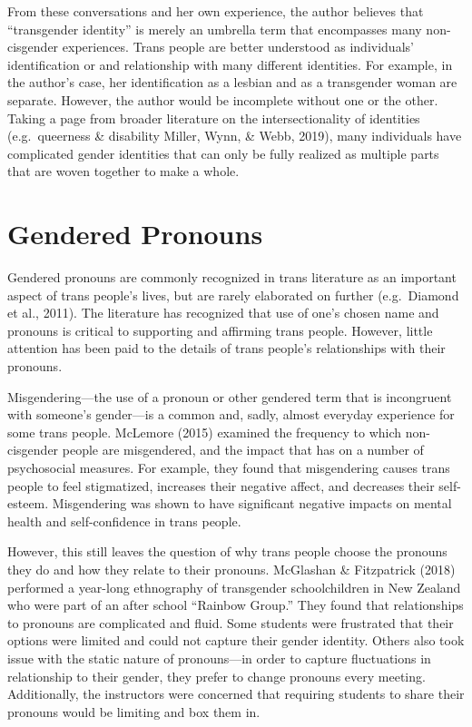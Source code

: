 \documentclass[12pt,twoside]{reedthesis}
\begin{document}
From these conversations and her own experience, the author believes that ``transgender identity'' is merely an umbrella term that encompasses many non-cisgender experiences. Trans people are better understood as individuals' identification or and relationship with many different identities. For example, in the author's case, her identification as a lesbian and as a transgender woman are separate. However, the author would be incomplete without one or the other. Taking a page from broader literature on the intersectionality of identities (e.g.~queerness \& disability Miller, Wynn, \& Webb, 2019), many individuals have complicated gender identities that can only be fully realized as multiple parts that are woven together to make a whole.

\hypertarget{gendered-pronouns}{%
\section{Gendered Pronouns}\label{gendered-pronouns}}

Gendered pronouns are commonly recognized in trans literature as an important aspect of trans people's lives, but are rarely elaborated on further (e.g.~Diamond et al., 2011). The literature has recognized that use of one's chosen name and pronouns is critical to supporting and affirming trans people. However, little attention has been paid to the details of trans people's relationships with their pronouns.

Misgendering---the use of a pronoun or other gendered term that is incongruent with someone's gender---is a common and, sadly, almost everyday experience for some trans people. McLemore (2015) examined the frequency to which non-cisgender people are misgendered, and the impact that has on a number of psychosocial measures. For example, they found that misgendering causes trans people to feel stigmatized, increases their negative affect, and decreases their self-esteem. Misgendering was shown to have significant negative impacts on mental health and self-confidence in trans people.

However, this still leaves the question of why trans people choose the pronouns they do and how they relate to their pronouns. McGlashan \& Fitzpatrick (2018) performed a year-long ethnography of transgender schoolchildren in New Zealand who were part of an after school ``Rainbow Group.'' They found that relationships to pronouns are complicated and fluid. Some students were frustrated that their options were limited and could not capture their gender identity. Others also took issue with the static nature of pronouns---in order to capture fluctuations in relationship to their gender, they prefer to change pronouns every meeting. Additionally, the instructors were concerned that requiring students to share their pronouns would be limiting and box them in.
\end{document}
